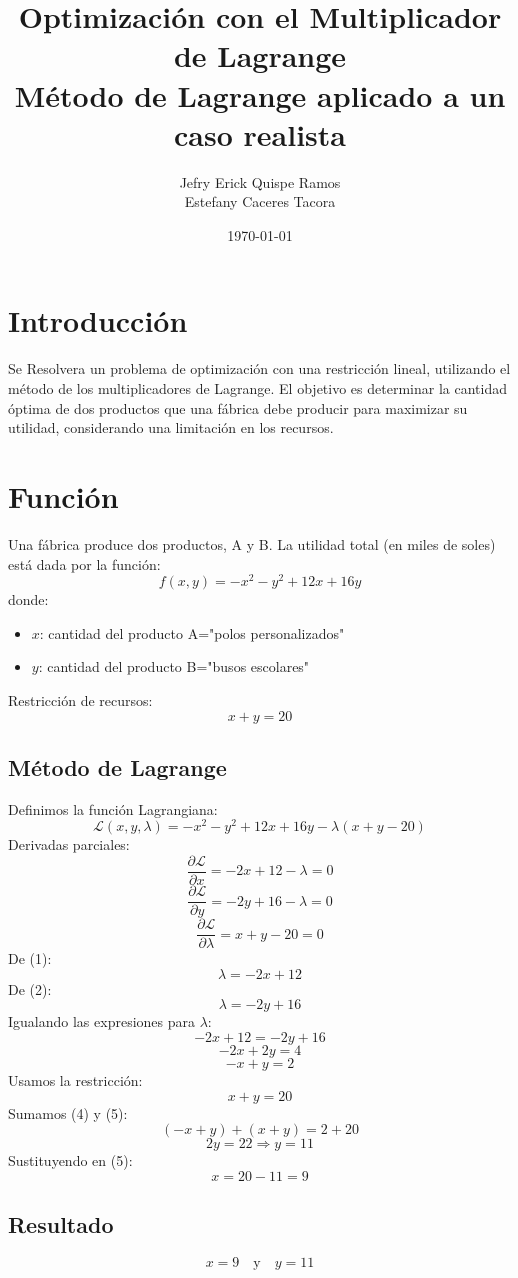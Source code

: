 \documentclass{article}
\title{Optimización con el Multiplicador de Lagrange\\
\large Método de Lagrange aplicado a un caso realista}
\author{Jefry Erick Quispe Ramos\\
Estefany Caceres Tacora}
\date{\today}
\begin{document}
\maketitle

\section*{Introducción}
Se Resolvera un problema de optimización con una restricción lineal, utilizando el método de los multiplicadores de Lagrange. El objetivo es determinar la cantidad óptima de dos productos que una fábrica debe producir para maximizar su utilidad, considerando una limitación en los recursos.

\section*{Función}
Una fábrica produce dos productos, A y B. La utilidad total (en miles de soles) está dada por la función:
\[
f(x,y) = -x^2 - y^2 + 12x + 16y
\]
donde:
\begin{itemize}
    \item $x$: cantidad del producto A="polos personalizados"
    \item $y$: cantidad del producto B="busos escolares"
\end{itemize}
Restricción de recursos:
\[
x + y = 20
\]

\subsection*{Método de Lagrange}
Definimos la función Lagrangiana:
\[
\mathcal{L}(x, y, \lambda) = -x^2 - y^2 + 12x + 16y - \lambda(x + y - 20)
\]
Derivadas parciales:
\[
\frac{\partial \mathcal{L}}{\partial x} = -2x + 12 - \lambda = 0 \tag{1}
\]
\[
\frac{\partial \mathcal{L}}{\partial y} = -2y + 16 - \lambda = 0 \tag{2}
\]
\[
\frac{\partial \mathcal{L}}{\partial \lambda} = x + y - 20 = 0 \tag{3}
\]
De (1):
\[
\lambda = -2x + 12
\]
De (2):
\[
\lambda = -2y + 16
\]
Igualando las expresiones para $\lambda$:
\[
-2x + 12 = -2y + 16
\]
\[
-2x + 2y = 4
\]
\[
-x + y = 2 \tag{4}
\]
Usamos la restricción:
\[
x + y = 20 \tag{5}
\]
Sumamos (4) y (5):
\[
(-x + y) + (x + y) = 2 + 20
\]
\[
2y = 22 \Rightarrow y = 11
\]
Sustituyendo en (5):
\[
x = 20 - 11 = 9
\]

\subsection*{Resultado}
\[
x = 9 \quad\text{y}\quad y = 11
\]
\end{document}
